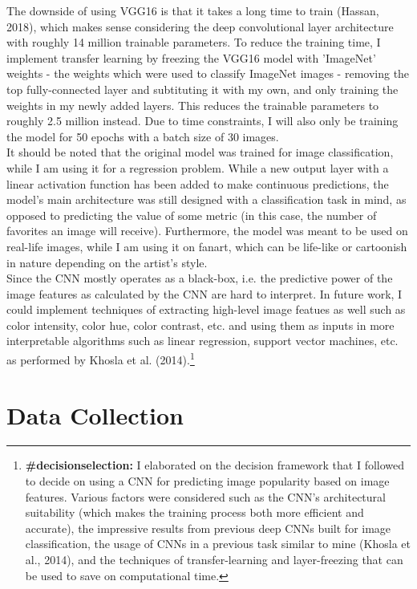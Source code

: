 \documentclass[11pt]{article}
\begin{document}
The downside of using VGG16 is that it takes a long time to train
(Hassan, 2018), which makes sense considering the deep convolutional
layer architecture with roughly 14 million trainable parameters. To
reduce the training time, I implement transfer learning by freezing the
VGG16 model with 'ImageNet' weights - the weights which were used to
classify ImageNet images - removing the top fully-connected layer and
subtituting it with my own, and only training the weights in my newly
added layers. This reduces the trainable parameters to roughly 2.5
million instead. Due to time constraints, I will also only be training
the model for 50 epochs with a batch size of 30 images.\\

It should be noted that the original model was trained for image
classification, while I am using it for a regression problem. While a
new output layer with a linear activation function has been added to
make continuous predictions, the model's main architecture was still
designed with a classification task in mind, as opposed to predicting
the value of some metric (in this case, the number of favorites an image
will receive). Furthermore, the model was meant to be used on real-life
images, while I am using it on fanart, which can be life-like or
cartoonish in nature depending on the artist's style.\\

Since the CNN mostly operates as a black-box, i.e. the predictive power
of the image features as calculated by the CNN are hard to interpret. In
future work, I could implement techniques of extracting high-level image
featues as well such as color intensity, color hue, color contrast, etc.
and using them as inputs in more interpretable algorithms such as linear
regression, support vector machines, etc. as performed by Khosla et al.
(2014).\footnote{\textbf{\#decisionselection:} I elaborated on the decision framework that I followed to decide on using a CNN for predicting image popularity based on image features. Various factors were considered such as the CNN's architectural suitability (which makes the training process both more efficient and accurate), the impressive results from previous deep CNNs built for image classification, the usage of CNNs in a previous task similar to mine (Khosla et al., 2014), and the techniques of transfer-learning and layer-freezing that can be used to save on computational time.}
\newpage
    \section{Data Collection}
\end{document}
